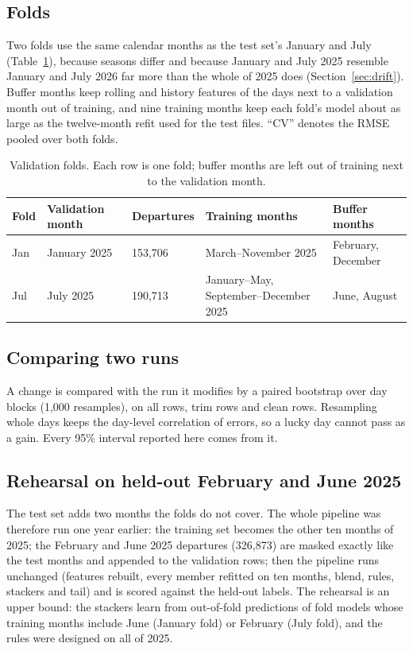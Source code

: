 \documentclass[
  manuscript=article,
  layout=preprint,
  year=2026,
  volume=x,
]{extra/joas}
\begin{document}
\subsection{Folds}
\label{sec:folds}

Two folds use the same calendar months as the test set's January and July (Table~\ref{tb:folds}), because seasons differ and because
January and July 2025 resemble January and July 2026 far more than the whole of 2025 does (Section~\ref{sec:drift}). Buffer months keep
rolling and history features of the days next to a validation month out of training, and nine training months keep each fold's model
about as large as the twelve-month refit used for the test files. ``CV'' denotes the RMSE pooled over both folds.

\begin{table}[htbp!]
  \centering
  \small
  \caption{Validation folds. Each row is one fold; buffer months are left out of training next to the validation month.}
  \label{tb:folds}
  \begin{tabular}{lllll}
  \toprule
  \textbf{Fold} & \textbf{Validation month} & \textbf{Departures} & \textbf{Training months} & \textbf{Buffer months} \\
  \midrule
  Jan & January 2025 & 153,706 & March--November 2025 & February, December \\
  Jul & July 2025 & 190,713 & January--May, September--December 2025 & June, August \\
  \bottomrule
  \end{tabular}
\end{table}

\subsection{Comparing two runs}

A change is compared with the run it modifies by a paired bootstrap over day blocks \cite{kunsch1989block} (1,000 resamples), on all rows,
trim rows and clean rows. Resampling whole days keeps the day-level correlation of errors, so a lucky day cannot pass as a gain. Every
95\% interval reported here comes from it.

\subsection{Rehearsal on held-out February and June 2025}
\label{sec:rehearsal}

The test set adds two months the folds do not cover. The whole pipeline was therefore run one year earlier: the training set becomes the
other ten months of 2025; the February and June 2025 departures (326,873) are masked exactly like the test months and appended to the
validation rows; then the pipeline runs unchanged (features rebuilt, every member refitted on ten months, blend, rules, stackers and tail)
and is scored against the held-out labels. The rehearsal is an upper bound: the stackers learn from out-of-fold predictions of fold models
whose training months include June (January fold) or February (July fold), and the rules were designed on all of 2025.
\end{document}
